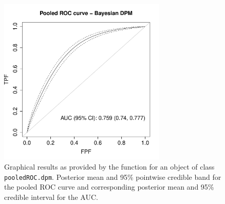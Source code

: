 \begin{figure}[ht!]
\begin{center}
\includegraphics[width=8cm]{pooled_ROC_dpm.pdf}
\end{center}
\caption{Graphical results as provided by the  function for an object of class \texttt{pooledROC.dpm}. Posterior mean and 95\% pointwise credible band for the pooled ROC curve and corresponding posterior mean and 95\% credible interval for the AUC.}
\label{pROC_dpm_plot}
\end{figure}

